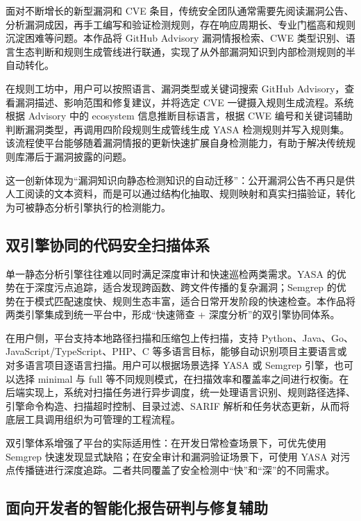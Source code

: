 \documentclass[a4paper,12pt,UTF8]{ctexart}
\numberwithin{figure}{section}
\numberwithin{table}{section}
\numberwithin{equation}{section}
\begin{document}
{\songti
面对不断增长的新型漏洞和 CVE 条目，传统安全团队通常需要先阅读漏洞公告、分析漏洞成因，再手工编写和验证检测规则，存在响应周期长、专业门槛高和规则沉淀困难等问题。本作品将 GitHub Advisory 漏洞情报检索、CWE 类型识别、语言生态判断和规则生成管线进行联通，实现了从外部漏洞知识到内部检测规则的半自动转化。

在规则工坊中，用户可以按照语言、漏洞类型或关键词搜索 GitHub Advisory，查看漏洞描述、影响范围和修复建议，并将选定 CVE 一键摄入规则生成流程。系统根据 Advisory 中的 ecosystem 信息推断目标语言，根据 CWE 编号和关键词辅助判断漏洞类型，再调用四阶段规则生成管线生成 YASA 检测规则并写入规则集。该流程使平台能够随着漏洞情报的更新快速扩展自身检测能力，有助于解决传统规则库滞后于漏洞披露的问题。

这一创新体现为“漏洞知识向静态检测知识的自动迁移”：公开漏洞公告不再只是供人工阅读的文本资料，而是可以通过结构化抽取、规则映射和真实扫描验证，转化为可被静态分析引擎执行的检测能力。
\par}

\subsection{双引擎协同的代码安全扫描体系}

{\songti
单一静态分析引擎往往难以同时满足深度审计和快速巡检两类需求。YASA 的优势在于深度污点追踪，适合发现跨函数、跨文件传播的复杂漏洞；Semgrep 的优势在于模式匹配速度快、规则生态丰富，适合日常开发阶段的快速检查。本作品将两类引擎集成到统一平台中，形成“快速筛查 + 深度分析”的双引擎协同体系。

在用户侧，平台支持本地路径扫描和压缩包上传扫描，支持 Python、Java、Go、JavaScript/TypeScript、PHP、C 等多语言目标，能够自动识别项目主要语言或对多语言项目逐语言扫描。用户可以根据场景选择 YASA 或 Semgrep 引擎，也可以选择 minimal 与 full 等不同规则模式，在扫描效率和覆盖率之间进行权衡。在后端实现上，系统对扫描任务进行异步调度，统一处理语言识别、规则路径选择、引擎命令构造、扫描超时控制、目录过滤、SARIF 解析和任务状态更新，从而将底层工具调用组织为可管理的工程流程。

双引擎体系增强了平台的实际适用性：在开发日常检查场景下，可优先使用 Semgrep 快速发现显式缺陷；在安全审计和漏洞验证场景下，可使用 YASA 对污点传播链进行深度追踪。二者共同覆盖了安全检测中“快”和“深”的不同需求。
\par}

\subsection{面向开发者的智能化报告研判与修复辅助}
\end{document}
